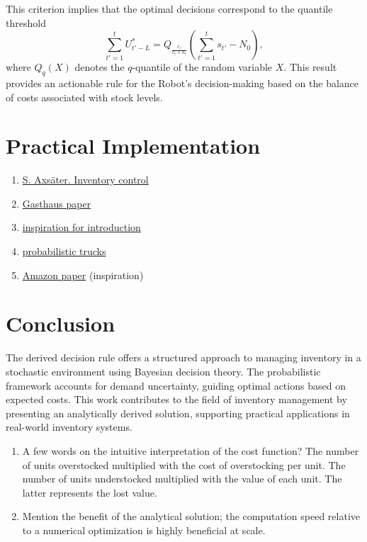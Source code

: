 \documentclass[a4paper,12pt]{article}
\theoremstyle{definition}
\begin{document}
	This criterion implies that the optimal decisions correspond to the quantile threshold
	\begin{equation}
		\sum_{t'=1}^{t} U_{t'-L}^* = Q_{\frac{c_t}{c_t+h_t}} \left( \sum_{t'=1}^{t} s_{t'} - N_0 \right),
	\end{equation}
	where $Q_q(X)$ denotes the $q$-quantile of the random variable $X$. This result provides an actionable rule for the Robot’s decision-making based on the balance of costs associated with stock levels.
	
	\section{Practical Implementation}
	\begin{enumerate}
		\item \href{https://www.academia.edu/27965536/Inventorycontroltextbook_140429044831_phpapp02_1_}{S. Axsäter. Inventory control}
		\item \href{https://proceedings.mlr.press/v151/kan22a/kan22a.pdf}{Gasthaus paper}
		\item \href{https://arxiv.org/pdf/2012.02392}{inspiration for introduction}
		\item \href{https://arxiv.org/pdf/2310.17168}{probabilistic trucks}
		\item \href{https://arxiv.org/pdf/2310.16096}{Amazon paper} (inspiration)
	\end{enumerate}
	
	
	\section{Conclusion}
	The derived decision rule offers a structured approach to managing inventory in a stochastic environment using Bayesian decision theory. The probabilistic framework accounts for demand uncertainty, guiding optimal actions based on expected costs. This work contributes to the field of inventory management by presenting an analytically derived solution, supporting practical applications in real-world inventory systems.
	
	\begin{enumerate}
		\item A few words on the intuitive interpretation of the cost function? The number of units overstocked multiplied with the cost of overstocking per unit. The number of units understocked multiplied with the value of each unit. The latter represents the lost value.
		\item Mention the benefit of the analytical solution; the computation speed relative to a numerical optimization is highly beneficial at scale.
		
	\end{enumerate}
	
	\newpage
	\begin{appendices}
		
	\end{appendices}
	
	
	
	
	
	
\end{document}
